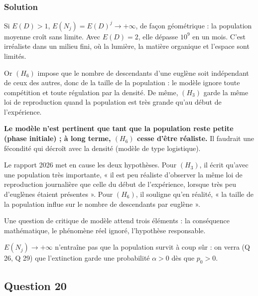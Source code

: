 \documentclass[11pt,a4paper]{article}
\begin{document}
\hypertarget{solution-39}{%
\subsubsection{Solution}\label{solution-39}}

Si \(E(D)>1\), \(E(N_j)=E(D)^j\to+\infty\), de façon géométrique : la population moyenne croît sans limite. Avec \(E(D)=2\), elle dépasse \(10^9\) en un mois. C'est irréaliste dans un milieu fini, où la lumière, la matière organique et l'espace sont limités.

Or \((H_6)\) impose que le nombre de descendants d'une euglène soit indépendant de ceux des autres, donc de la taille de la population : le modèle ignore toute compétition et toute régulation par la densité. De même, \((H_3)\) garde la même loi de reproduction quand la population est très grande qu'au début de l'expérience.

\textbf{Le modèle n'est pertinent que tant que la population reste petite (phase initiale) ; à long terme, \((H_6)\) cesse d'être réaliste.} Il faudrait une fécondité qui décroît avec la densité (modèle de type logistique).

\begin{jury}

Le rapport 2026 met en cause les deux hypothèses. Pour \((H_3)\), il écrit qu'avec une population très importante, « il est peu réaliste d'observer la même loi de reproduction journalière que celle du début de l'expérience, lorsque très peu d'euglènes étaient présentes ». Pour \((H_6)\), il souligne qu'en réalité, « la taille de la population influe sur le nombre de descendants par euglène ».

\end{jury}

\begin{methode}

Une question de critique de modèle attend trois éléments : la conséquence mathématique, le phénomène réel ignoré, l'hypothèse responsable.

\end{methode}

\begin{piege}

\(E(N_j)\to+\infty\) n'entraîne pas que la population survit à coup sûr : on verra (Q 26, Q 29) que l'extinction garde une probabilité \(\alpha>0\) dès que \(p_0>0\).

\end{piege}

\hypertarget{question-20}{%
\subsection{Question 20}\label{question-20}}
\end{document}
